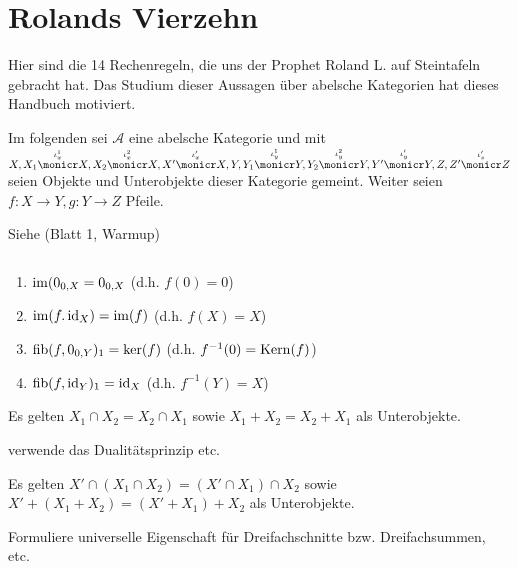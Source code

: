 \section{Rolands Vierzehn}

Hier sind die 14 Rechenregeln, die uns der Prophet Roland L. auf Steintafeln gebracht hat. Das Studium dieser Aussagen über abelsche Kategorien hat dieses Handbuch motiviert.

Im folgenden sei $\mathcal A$ eine abelsche Kategorie und mit $X,
X_1 \overset{\iota_x^1}\monicr X,
X_2 \overset{\iota_x^2}\monicr X,
X'  \overset{\iota_x'}\monicr X,
Y,
Y_1 \overset{\iota_y^1}\monicr Y,
Y_2 \overset{\iota_y^2}\monicr Y,
Y'  \overset{\iota_y'}\monicr Y,
Z,
Z'  \overset{\iota_z'}\monicr Z$
seien Objekte und Unterobjekte dieser Kategorie gemeint.
Weiter seien $f:X\to Y, g:Y\to Z$ Pfeile.

\begin{defn}[Objektnotation]
\end{defn}

\begin{prop}[Dualitätsprinzip]
Siehe (Blatt 1, Warmup)
\end{prop}

\begin{lemm}[Regel (a)] $\quad$ %
\begin{enumerate}
\item $\operatorname{im}(0_{0,X} = 0_{0,X}$ (d.h. $f(0) = 0$)
\item $\operatorname{im}(f.\operatorname{id}_X) = \operatorname{im}(f)$ (d.h. $f(X) = X$)
\item $\operatorname{fib}(f,0_{0,Y})_1 = \ker(f)$ (d.h. $f^{-1}(0) = \operatorname{Kern}(f)$)
\item $\operatorname{fib}(f,\operatorname{id}_Y)_1 = \operatorname{id}_X$ (d.h. $f^{-1}(Y) = X$)
\end{enumerate}
\end{lemm}

\begin{lemm}[Regel (b)]
Es gelten $X_1 \cap X_2 = X_2 \cap X_1$
sowie $X_1 + X_2 = X_2 + X_1$ als Unterobjekte.
\end{lemm}
\begin{bew}
verwende das Dualitätsprinzip etc.
\end{bew}

\begin{lemm}[Regel (c)]
Es gelten $X' \cap (X_1 \cap X_2) = (X' \cap X_1) \cap X_2$ 
sowie $X' + (X_1 + X_2) = (X' + X_1) + X_2$ als Unterobjekte.
\end{lemm}
\begin{bew}
Formuliere universelle Eigenschaft für Dreifachschnitte bzw. Dreifachsummen, etc.
\end{bew}

